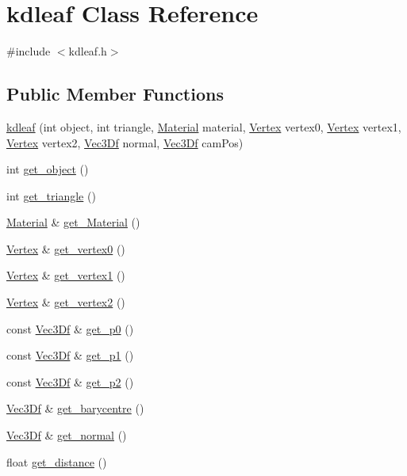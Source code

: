 \hypertarget{classkdleaf}{
\section{kdleaf Class Reference}
\label{classkdleaf}
}


{\ttfamily \#include $<$kdleaf.h$>$}

\subsection*{Public Member Functions}
\begin{DoxyCompactItemize}
\item 
\hyperlink{classkdleaf_a61f8dc444b059efc74a8407ea22c64b6}{kdleaf} (int object, int triangle, \hyperlink{class_material}{Material} material, \hyperlink{class_vertex}{Vertex} vertex0, \hyperlink{class_vertex}{Vertex} vertex1, \hyperlink{class_vertex}{Vertex} vertex2, \hyperlink{class_vec3_d}{Vec3Df} normal, \hyperlink{class_vec3_d}{Vec3Df} camPos)
\item 
int \hyperlink{classkdleaf_a21e06e09640a9d8142874916b98a37a9}{get\_\-object} ()
\item 
int \hyperlink{classkdleaf_a3d9647e804925ed89db806d6dcbd61bc}{get\_\-triangle} ()
\item 
\hyperlink{class_material}{Material} \& \hyperlink{classkdleaf_a37dd9e3906892e5fe500ef483d70f915}{get\_\-Material} ()
\item 
\hyperlink{class_vertex}{Vertex} \& \hyperlink{classkdleaf_a54a1ee1595eef900d154b2e1311c75ff}{get\_\-vertex0} ()
\item 
\hyperlink{class_vertex}{Vertex} \& \hyperlink{classkdleaf_a8e59b65dc9de0d6c4d26f3658388497f}{get\_\-vertex1} ()
\item 
\hyperlink{class_vertex}{Vertex} \& \hyperlink{classkdleaf_afe839295836ac154b0c6cc953c487148}{get\_\-vertex2} ()
\item 
const \hyperlink{class_vec3_d}{Vec3Df} \& \hyperlink{classkdleaf_a22bd977d3771ad4c1cd2e44e51583ed3}{get\_\-p0} ()
\item 
const \hyperlink{class_vec3_d}{Vec3Df} \& \hyperlink{classkdleaf_a96acefe5b601f195bd9def7481a73693}{get\_\-p1} ()
\item 
const \hyperlink{class_vec3_d}{Vec3Df} \& \hyperlink{classkdleaf_ab1bae043e7f280a7df9fc181c400d894}{get\_\-p2} ()
\item 
\hyperlink{class_vec3_d}{Vec3Df} \& \hyperlink{classkdleaf_ac666a00919ebe62e28a07859958e819e}{get\_\-barycentre} ()
\item 
\hyperlink{class_vec3_d}{Vec3Df} \& \hyperlink{classkdleaf_aad846bf2b18442b770dc4be9291402c9}{get\_\-normal} ()
\item 
float \hyperlink{classkdleaf_aa47457a9b7916bd6bcae50b4b77722c4}{get\_\-distance} ()
\end{DoxyCompactItemize}


